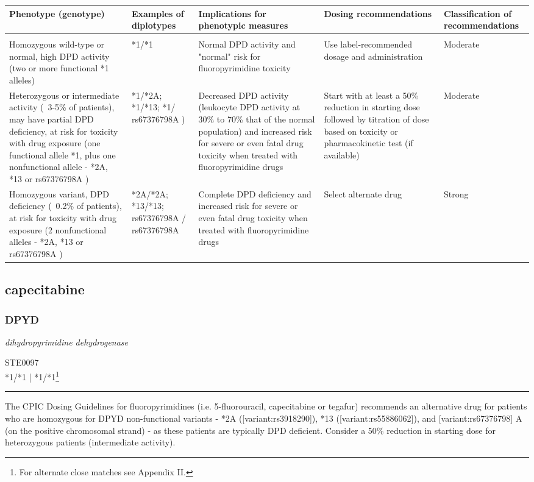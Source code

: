 \documentclass{report}
\begin{document}
      \begin{tabularx}{\textwidth}{ XXXXX }
      \textbf{ Phenotype (genotype) }&\textbf{ Examples of diplotypes }&\textbf{ Implications for phenotypic measures }&\textbf{ Dosing recommendations }&\textbf{ Classification of recommendations  } \\ \hline \\  Homozygous wild-type or normal, high DPD activity (two or more functional *1 alleles) & *1/*1 & Normal DPD activity and "normal" risk for fluoropyrimidine toxicity & Use label-recommended dosage and administration & Moderate  \\  Heterozygous or intermediate activity (~3-5\% of patients), may have partial DPD deficiency, at risk for toxicity with drug exposure (one functional allele *1, plus one nonfunctional allele - *2A, *13 or rs67376798A ) & *1/*2A; *1/*13; *1/ rs67376798A ) & Decreased DPD activity (leukocyte DPD activity at 30\% to 70\% that of the normal population) and increased risk for severe or even fatal drug toxicity when treated with fluoropyrimidine drugs & Start with at least a 50\% reduction in starting dose followed by titration of dose based on toxicity  or pharmacokinetic test (if available) & Moderate  \\  Homozygous variant, DPD deficiency (~0.2\% of patients), at risk for toxicity with drug exposure (2 nonfunctional alleles - *2A, *13 or rs67376798A ) & *2A/*2A; *13/*13; rs67376798A  / rs67376798A  & Complete DPD deficiency and increased risk for severe or even fatal drug toxicity when treated with fluoropyrimidine drugs & Select alternate drug & Strong  \\ 
      \end{tabularx}
      
      \newpage
      \normalsize





\subsection{ capecitabine }

\subsubsection{ DPYD }
     \textit{ dihydropyrimidine dehydrogenase } \begin{flushright} \textsc{ STE0097 \\ *1/*1  | *1/*1\footnote{For alternate close matches see Appendix II.} }\end{flushright}
      \hrule \vspace{6pt}
      The CPIC Dosing Guidelines for fluoropyrimidines (i.e. 5-fluorouracil, capecitabine or tegafur) recommends an alternative drug for patients who are homozygous for DPYD non-functional variants - *2A ([variant:rs3918290]), *13 ([variant:rs55886062]), and [variant:rs67376798] A (on the positive chromosomal strand) - as these patients are typically DPD deficient.  Consider a 50\% reduction in starting dose for heterozygous patients (intermediate activity). \newline
      \scriptsize
      
\end{document}
